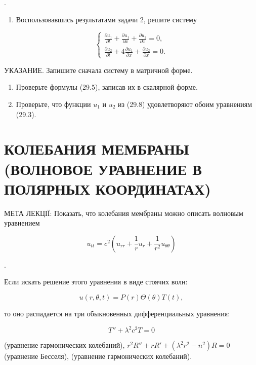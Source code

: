 \documentclass[
  ukrainian,
]{article}
\providecommand{\tightlist}{%
  \setlength{\itemsep}{0pt}\setlength{\parskip}{0pt}}
\begin{document}
.

\begin{enumerate}
\def\labelenumi{\arabic{enumi}.}
\setcounter{enumi}{2}
\tightlist
\item
  Воспользовавшись результатами задачи 2, решите систему
\end{enumerate}

\[
\begin{cases} \frac{\partial u_1}{\partial t} + \frac{\partial u_1}{\partial x} + \frac{\partial u_2}{\partial x} = 0, \\ \frac{\partial u_2}{\partial t} + 4 \frac{\partial u_1}{\partial x} + \frac{\partial u_2}{\partial x} = 0. \end{cases}
\]

УКАЗАНИЕ. Запишите сначала систему в матричной форме.

\begin{enumerate}
\def\labelenumi{\arabic{enumi}.}
\setcounter{enumi}{3}
\item
  Проверьте формулы (29.5), записав их в скалярной форме.
\item
  Проверьте, что функции \(u_1\) и \(u_2\) из (29.8) удовлетворяют обоим
  уравнениям (29.3).
\end{enumerate}

\section{КОЛЕБАНИЯ МЕМБРАНЫ (ВОЛНОВОЕ УРАВНЕНИЕ В ПОЛЯРНЫХ
КООРДИНАТАХ)}\label{ux43aux43eux43bux435ux431ux430ux43dux438ux44f-ux43cux435ux43cux431ux440ux430ux43dux44b-ux432ux43eux43bux43dux43eux432ux43eux435-ux443ux440ux430ux432ux43dux435ux43dux438ux435-ux432-ux43fux43eux43bux44fux440ux43dux44bux445-ux43aux43eux43eux440ux434ux438ux43dux430ux442ux430ux445}

МЕТА ЛЕКЦІЇ: Показать, что колебания мембраны можно описать волновым
уравнением

\[
u_{tt} = c^2 \left( u_{rr} + \frac{1}{r} u_r + \frac{1}{r^2} u_{\theta\theta} \right)
\]

.

Если искать решение этого уравнения в виде стоячих волн:

\[
u(r, \theta, t) = P(r) \Theta(\theta) T(t),
\]

то оно распадается на три обыкновенных дифференциальных уравнения:

\[
T'' + \lambda^2 c^2 T = 0
\]

(уравнение гармонических колебаний),
\(r^2 R'' + rR' + (\lambda^2 r^2 - n^2) R = 0\) (уравнение Бесселя),
(уравнение гармонических колебаний).
\end{document}
